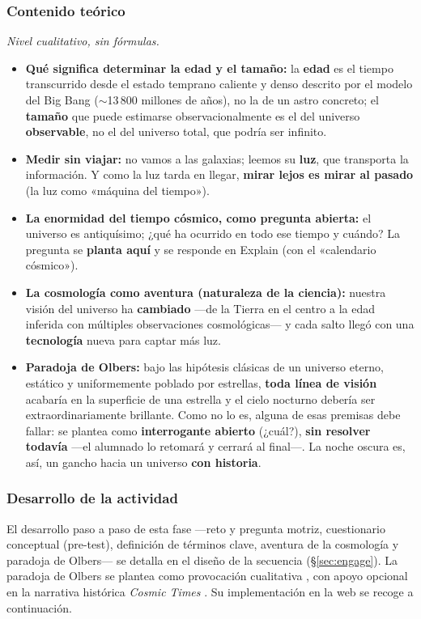 \subsubsection*{Contenido teórico}

\textit{Nivel cualitativo, sin fórmulas.}
\begin{itemize}
\item \textbf{Qué significa determinar la edad y el tamaño:} la \textbf{edad} es el tiempo transcurrido desde el estado temprano caliente y denso descrito por el modelo del Big Bang ($\sim$13\,800 millones de años), no la de un astro concreto; el \textbf{tamaño} que puede estimarse observacionalmente es el del universo \textbf{observable}, no el del universo total, que podría ser infinito.
\item \textbf{Medir sin viajar:} no vamos a las galaxias; leemos su \textbf{luz}, que transporta la información. Y como la luz tarda en llegar, \textbf{mirar lejos es mirar al pasado} (la luz como «máquina del tiempo»).
\item \textbf{La enormidad del tiempo cósmico, como pregunta abierta:} el universo es antiquísimo; ¿qué ha ocurrido en todo ese tiempo y cuándo? La pregunta se \textbf{planta aquí} y se responde en Explain (con el «calendario cósmico»).
\item \textbf{La cosmología como aventura (naturaleza de la ciencia):} nuestra visión del universo ha \textbf{cambiado} ---de la Tierra en el centro a la edad inferida con múltiples observaciones cosmológicas--- y cada salto llegó con una \textbf{tecnología} nueva para captar más luz.
\item \textbf{Paradoja de Olbers:} bajo las hipótesis clásicas de un universo eterno, estático y uniformemente poblado por estrellas, \textbf{toda línea de visión} acabaría en la superficie de una estrella y el cielo nocturno debería ser extraordinariamente brillante. Como no lo es, alguna de esas premisas debe fallar: se plantea como \textbf{interrogante abierto} (¿cuál?), \textbf{sin resolver todavía} ---el alumnado lo retomará y cerrará al final---. La noche oscura es, así, un gancho hacia un universo \textbf{con historia}.
\end{itemize}

\subsubsection*{Desarrollo de la actividad}

El desarrollo paso a paso de esta fase ---reto y pregunta motriz, cuestionario conceptual (pre-test), definición de términos clave, aventura de la cosmología y paradoja de Olbers--- se detalla en el diseño de la secuencia (§\ref{sec:engage}). La paradoja de Olbers se plantea como provocación cualitativa \parencite{santos2014}, con apoyo opcional en la narrativa histórica \textit{Cosmic Times} \parencite{lochner2009,nunes2025}. Su implementación en la web se recoge a continuación.

